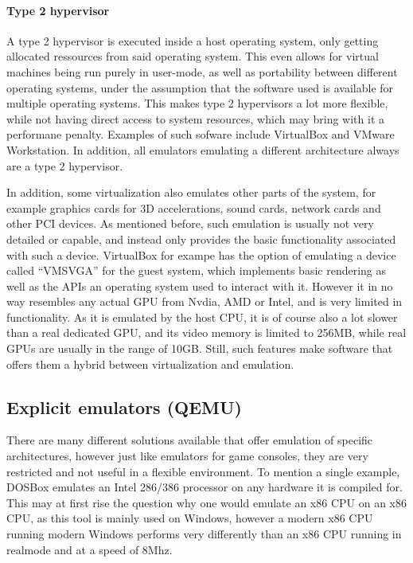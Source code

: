 \paragraph{Type 2 hypervisor} A type 2 hypervisor is executed inside a host operating system,
only getting allocated ressources from said operating system.
This even allows for virtual machines being run purely in user-mode,
as well as portability between different operating systems,
under the assumption that the software used is available for multiple operating systems.
This makes type 2 hypervisors a lot more flexible,
while not having direct access to system resources,
which may bring with it a performane penalty.
Examples of such sofware include VirtualBox and VMware Workstation\cite{hypervisor}.
In addition, all emulators emulating a different architecture always are a type 2 hypervisor.

In addition, some virtualization also emulates other parts of the system,
for example graphics cards for 3D accelerations, sound cards, network cards
and other PCI devices.
As mentioned before, such emulation is usually not very detailed or capable,
and instead only provides the basic functionality associated with such a device.
VirtualBox for exampe has the option of emulating a device called \enquote{VMSVGA}
for the guest system, which implements basic rendering as well as the APIs
an operating system used to interact with it.
However it in no way resembles any actual GPU from Nvdia, AMD or Intel,
and is very limited in functionality.
As it is emulated by the host CPU, it is of course also a lot slower than a real dedicated GPU,
and its video memory is limited to 256MB, while real GPUs are usually in the range of 10GB.
Still, such features make software that offers them a hybrid between virtualization and emulation.

\subsection{Explicit emulators (QEMU)}
There are many different solutions available that offer emulation of specific architectures,
however just like emulators for game consoles, they are very restricted and not useful in a flexible environment.
To mention a single example, DOSBox emulates an Intel 286/386 processor on any hardware it is compiled for.
This may at first rise the question why one would emulate an x86 CPU on an x86 CPU,
as this tool is mainly used on Windows,
however a modern x86 CPU running modern Windows performs very differently than
an x86 CPU running in realmode and at a speed of 8Mhz.


